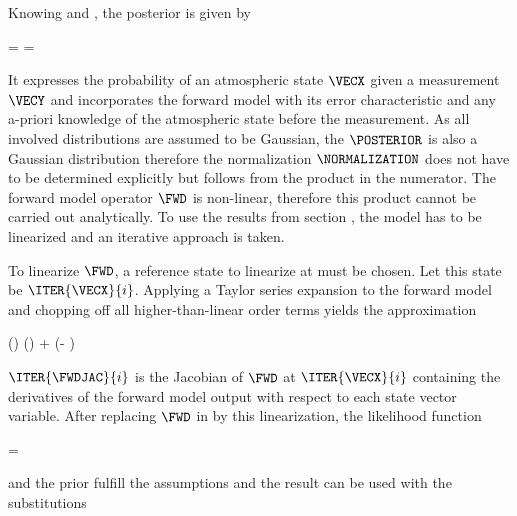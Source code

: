     Knowing  and , the
    posterior {\PDF} is given by

    \startformula
        \POSTERIOR
        = \frac{\LIKELIHOOD \PRIOR}{\NORMALIZATION}
        = \frac{\GAUSS{\VECY}{\FWD(\VECX) + \MEANVECERR}{\COVMATERR}
            ~\GAUSS{\VECX}{\MEANVECA}{\COVMATA}}{\NORMALIZATION} \EQSTOP
    \stopformula

    It expresses the probability of an atmospheric state $\VECX$ given a
    measurement $\VECY$ and incorporates the forward model with its error
    characteristic and any a-priori knowledge of the atmospheric state before
    the measurement. As all involved distributions are assumed to be Gaussian,
    the $\POSTERIOR$ is also a Gaussian distribution therefore the
    normalization $\NORMALIZATION$ does not have to be determined explicitly
    but follows from the product in the numerator. The forward model operator
    $\FWD$ is non-linear, therefore this product cannot be carried out
    analytically. To use the results from section , the
    model has to be linearized and an iterative approach is taken.

    \startsubsection[title=Iterative Solutions]

        To linearize $\FWD$, a reference state to linearize at must be chosen.
        Let this state be $\ITER{\VECX}{i}$. Applying a Taylor series
        expansion to the forward model and chopping off all higher-than-linear
        order terms yields the approximation

        \startformula
            \FWD(\VECX) \approx \FWD()
                +  (\VECX - ) \EQSTOP
        \stopformula

        $\ITER{\FWDJAC}{i}$ is the Jacobian of $\FWD$ at $\ITER{\VECX}{i}$
        containing the derivatives of the forward model output with respect
        to each state vector variable. After replacing $\FWD$ in
         by this linearization, the likelihood
        function

        \startformula
            \LIKELIHOOD = 
        \stopformula

        and the prior  fulfill the assumptions
         and the result  can be used
        with the substitutions

